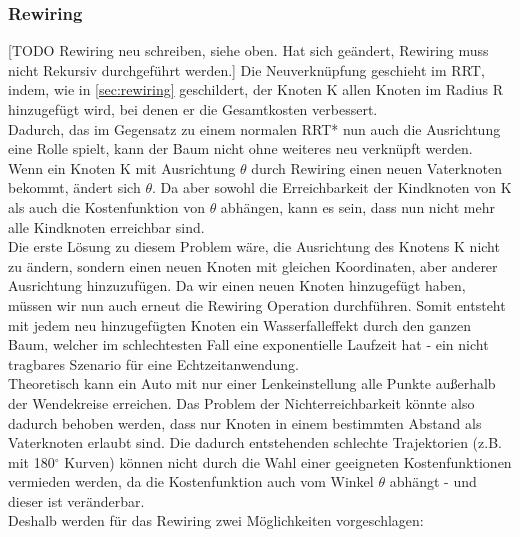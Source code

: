\subsubsection{Rewiring}
[TODO Rewiring neu schreiben, siehe oben. Hat sich geändert, Rewiring muss nicht Rekursiv durchgeführt werden.] 
Die Neuverknüpfung geschieht im RRT, indem, wie in \ref{sec:rewiring} geschildert, der Knoten K allen Knoten im Radius R hinzugefügt wird, bei denen er die Gesamtkosten verbessert. \\
Dadurch, das im Gegensatz zu einem normalen RRT* nun auch die Ausrichtung eine Rolle spielt, kann der Baum nicht ohne weiteres neu verknüpft werden. Wenn ein Knoten K mit Ausrichtung $\theta$ durch Rewiring einen neuen Vaterknoten bekommt, ändert sich $\theta$. Da aber sowohl die Erreichbarkeit der Kindknoten von K als auch die Kostenfunktion von $\theta$ abhängen, kann es sein, dass nun nicht mehr alle Kindknoten erreichbar sind. \\
Die erste Lösung zu diesem Problem wäre, die Ausrichtung des Knotens K nicht zu ändern, sondern einen neuen Knoten mit gleichen Koordinaten, aber anderer Ausrichtung hinzuzufügen. Da wir einen neuen Knoten hinzugefügt haben, müssen wir nun auch erneut die Rewiring Operation durchführen. Somit entsteht mit jedem neu hinzugefügten Knoten ein Wasserfalleffekt durch den ganzen Baum, welcher im schlechtesten Fall eine exponentielle Laufzeit hat - ein nicht tragbares Szenario für eine Echtzeitanwendung. \\
Theoretisch kann ein Auto mit nur einer Lenkeinstellung alle Punkte außerhalb der Wendekreise erreichen. Das Problem der Nichterreichbarkeit könnte also dadurch behoben werden, dass nur Knoten in einem bestimmten Abstand als Vaterknoten erlaubt sind. Die dadurch entstehenden schlechte Trajektorien (z.B. mit 180$^{\circ}$ Kurven) können nicht durch die Wahl einer geeigneten Kostenfunktionen vermieden werden, da die Kostenfunktion auch vom Winkel $\theta$ abhängt - und dieser ist veränderbar. \\
Deshalb werden für das Rewiring zwei Möglichkeiten vorgeschlagen:
